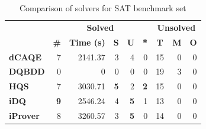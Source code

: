\documentclass[
  digital, %
  color,
  twoside, %
  table,   %
  nolof,     %
  nolot,     %
]{fithesis3}
\theoremstyle{definition}
\theoremstyle{remark}
\begin{document}
\begin{table}[ht]
\centering
\caption{Comparison of solvers for SAT benchmark set}%
\label{tab:SAT}
\begin{tabular}{|l|r|r|r|r|r|r|r|r|}
\hline
\multicolumn{1}{|c|}{}                                  & \multicolumn{5}{c|}{\textbf{Solved}}                                                                                                                                        & \multicolumn{3}{c|}{\textbf{Unsolved}}                                                                 \\  \hhline{~*{8}{-}}
\multicolumn{1}{|c|}{\multirow{-2}{*}{\textbf{Solver}}} & \multicolumn{1}{c|}{\textbf{\#}} & \multicolumn{1}{c|}{\textbf{Time (s)}} & \multicolumn{1}{c|}{\textbf{S}} & \multicolumn{1}{c|}{\textbf{U}} & \multicolumn{1}{c|}{\textbf{*}} & \multicolumn{1}{c|}{\textbf{T}} & \multicolumn{1}{c|}{\textbf{M}} & \multicolumn{1}{c|}{\textbf{O}} \\ \hline
\textbf{dCAQE} & \phantom{0}\num{7} & \num{2141.37} & \phantom{0}\num{3} & \phantom{0}\num{4} & \phantom{0}\num{0} & \num{15} & \phantom{0}\num{0} & \phantom{0}\num{0} \\ \hline
\textbf{DQBDD} & \num{0} & \num{0} & \num{0} & \num{0} & \num{0} & \num{19} & \num{3} & \num{0} \\ \hline
\textbf{HQS} & \num{7} & \num{3030.71} & \textbf{5} & \num{2} & \textbf{2} & \num{15} & \num{0} & \num{0} \\ \hline
\textbf{iDQ} & \textbf{9} & \num{2546.24} & \num{4} & \textbf{5} & \num{1} & \num{13} & \num{0} & \num{0} \\ \hline
\textbf{iProver} & \num{8} & \num{3260.57} & \num{3} & \textbf{5} & \num{0} & \num{14} & \num{0} & \num{0} \\ \hline
\end{tabular}
\end{table}
\end{document}
